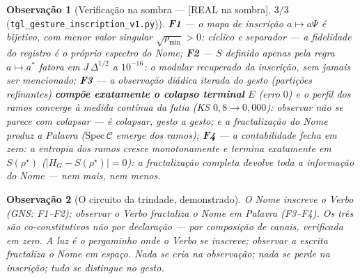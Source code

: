 \documentclass[11pt,a4paper]{article}
\newcommand{\SOMBRA}{\textsf{[REAL na sombra]}}
\newtheorem{remark}{Observação}
\theoremstyle{definition}
\begin{document}
\begin{remark}[Verificação na sombra --- \SOMBRA, $3/3$
(\texttt{tgl\_gesture\_inscription\_v1.py})]
\textbf{F1} --- o mapa de inscrição $a\mapsto a\Psi$ é bijetivo, com
menor valor singular $\sqrt{p_{\min}}>0$: cíclico e separador --- a
fidelidade do registro é o próprio espectro do Nome;
\textbf{F2} --- $S$ definido \emph{apenas} pela regra $a\mapsto a^*$
fatora em $J\,\Delta^{1/2}$ a $10^{-16}$: o modular recuperado da
inscrição, sem jamais ser mencionado;
\textbf{F3} --- a observação diádica iterada do gesto (partições
refinantes) \textbf{compõe exatamente o colapso terminal} $E$
(erro $0$) e o perfil dos ramos converge à medida contínua da fatia
(KS $0{,}8\to0{,}000$): observar não \emph{se parece} com colapsar ---
\emph{é} colapsar, gesto a gesto; e a fractalização do Nome produz a
Palavra ($\mathrm{Spec}\,\mathcal C$ emerge dos ramos);
\textbf{F4} --- a contabilidade fecha em zero: a entropia dos ramos
cresce monotonamente e termina \emph{exatamente} em $S(\rho^\star)$
($|H_G-S(\rho^\star)|=0$): a fractalização completa devolve toda a
informação do Nome --- nem mais, nem menos.
\end{remark}

\begin{remark}[O circuito da trindade, demonstrado]
O Nome inscreve o Verbo (GNS: F1--F2); observar o Verbo fractaliza o
Nome em Palavra (F3--F4). Os três são co-constitutivos não por
declaração --- por \emph{composição de canais}, verificada em zero.
\emph{A luz é o pergaminho onde o Verbo se inscreve; observar a
escrita fractaliza o Nome em espaço.} Nada se cria na observação; nada
se perde na inscrição; tudo se distingue no gesto.
\end{remark}

\end{document}
